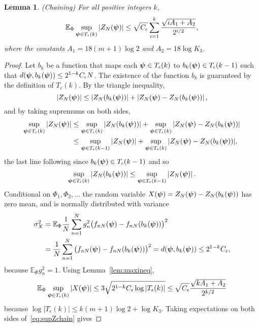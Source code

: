 \documentclass[aap]{imsart}
\newcommand{\expect}{{\mathbb E}}
\newcommand{\abs}[1]{\left\vert #1 \right\vert}
\newcommand{\sabs}[1]{\vert #1 \vert}
\newtheorem{lemma}{Lemma}
\begin{document}
\begin{lemma}\label{lem:chaining3}(Chaining)
For all positive integers $k$,
\[
\expect_{\Phi} \sup_{\psibf \in T_\epsilon(k) } \abs{ Z_N(\psibf) } \leq \sqrt{C_\epsilon} \sum_{i=1}^{k}\frac{\sqrt{ i A_1 + A_2 }}{2^{i/2}},
\]
where the constants $A_1 = 18(m+1)\log 2$ and $A_2 = 18\log K_3$.
\end{lemma}
\begin{proof}
Let $b_k$ be a function that maps each $\boldsymbol{\psi} \in T_\epsilon(k)$ to $b_k(\boldsymbol{\psi}) \in T_\epsilon(k-1)$ such that  $d(\boldsymbol{\psi},b_k(\boldsymbol{\psi})) \leq 2^{1-k} C_\epsilon N$.  The existence of the function $b_k$ is guaranteed by the definition of $T_\epsilon(k)$.  By the triangle inequality,
\[
\abs{ Z_N(\psibf) } \leq \abs{ Z_N(b_k(\psibf)) } + \abs{ Z_N(\psibf) - Z_N(b_k(\psibf))  },
\]
and by taking supremums on both sides,
\begin{align}
\sup_{\psibf \in T_\epsilon(k) } \sabs{ Z_N(\psibf) } &\leq \sup_{\psibf \in T_\epsilon(k) } \sabs{ Z_N(b_k(\psibf)) } + \sup_{\psibf \in T_\epsilon(k) } \sabs{ Z_N(\psibf) - Z_N(b_k(\psibf))  } \nonumber \\
&\leq \sup_{\psibf \in T_\epsilon(k-1)} \sabs{ Z_N(\psibf) } + \sup_{\psibf \in T_\epsilon(k)} \sabs{ Z_N(\psibf) - Z_N(b_k(\psibf)) }, \label{eq:supZchain}
\end{align}
the last line following since $b_k(\boldsymbol{\psi}) \in T_\epsilon(k-1)$ and so 
\[
\sup_{\psibf \in T_\epsilon(k)} \abs{ Z_N(b_k(\psibf)) } \leq \sup_{\psibf \in T_\epsilon(k-1)} \abs{ Z_N(\psibf) }.
\]
Conditional on $\Phi_1, \Phi_2, \dots$ the random variable $X(\boldsymbol{\psi}) = Z_N(\boldsymbol{\psi}) - Z_N(b_k(\boldsymbol{\psi}))$ has zero mean, and is normally distributed with variance
\begin{align*}
\sigma_X^2 &= \expect_{\Phi} \frac{1}{N} \sum_{n=1}^N g_n^2 \big( f_{nN}(\psibf) - f_{nN}(b_k(\psibf)) \big)^2 \\
&= \frac{1}{N} \sum_{n=1}^N \big( f_{nN}(\psibf) - f_{nN}(b_k(\psibf)) \big)^2 = d(\psibf, b_k(\psibf)) \leq 2^{1-k} C_\epsilon,
\end{align*}
because $\expect_{\Phi} g_n^2 = 1$.  Using Lemma~\ref{lem:maxineq}, 
\begin{align*}
\expect_{\Phi} \sup_{\psibf \in T_\epsilon(k)} \sabs{X(\psibf)} \leq 3\sqrt{2^{1-k} C_\epsilon \log\sabs{T_\epsilon(k)}} \leq \sqrt{C_\epsilon}\frac{\sqrt{  k A_1 + A_2 }}{2^{k/2}}
\end{align*}
because $\log\abs{T_\epsilon(k)} \leq k(m+1)\log 2 +  \log K_3$.  Taking expectations on both sides of~\eqref{eq:supZchain} gives

\end{proof}
\end{document}
